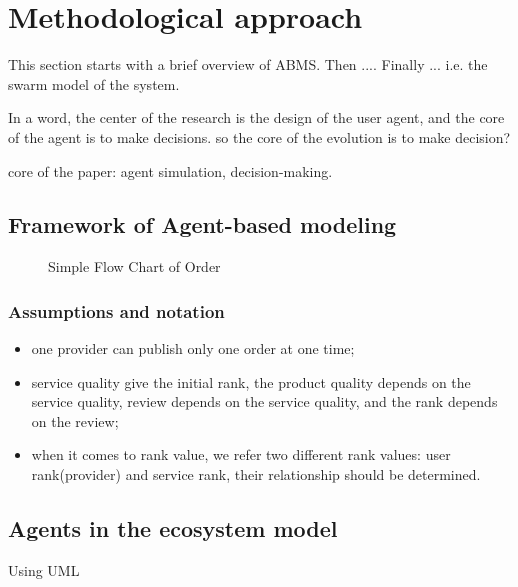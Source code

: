 \section{Methodological approach} %
\label{sec:methodological_approach}

This section starts with a brief overview of ABMS. Then .... Finally ...
i.e. the swarm model of the system.

In a word, the center of the research is the design of the user agent, and the core of the agent is to make decisions. so the core of the evolution is to make decision?

core of the paper: agent simulation, decision-making.

\subsection{Framework of Agent-based modeling} %
\label{sub:framework of agent based modeling}
\begin{figure}[htbp]
\centering\small
{} \hspace{0.09\textwidth}
\caption{Simple Flow Chart of Order}
\end{figure}

\subsubsection{Assumptions and notation}
\begin{itemize}
    \item one provider can publish only one order at one time;
    \item service quality give the initial rank, the product quality depends on the service quality, review depends on the service quality, and the rank depends on the review;
    \item when it comes to rank value, we refer two different rank values: user rank(provider) and service rank, their relationship should be determined.
\end{itemize}


\subsection{Agents in the ecosystem model} %
\label{sub:agents_in_the_ecosystem_model}
Using UML

